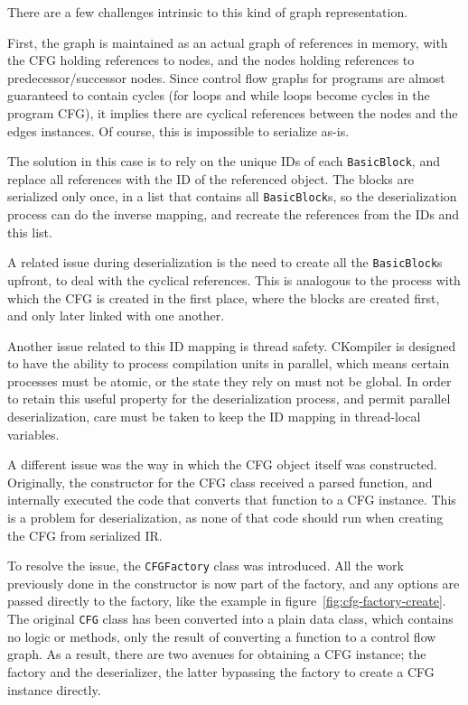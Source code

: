 \documentclass[lettersize,journal]{IEEEtran}
\begin{document}
    There are a few challenges intrinsic to this kind of graph representation.

    First, the graph is maintained as an actual graph of references in memory, with the CFG holding references to nodes,
    and the nodes holding references to predecessor/successor nodes.
    Since control flow graphs for programs are almost guaranteed to contain cycles (for loops and while loops become
    cycles in the program CFG), it implies there are cyclical references between the nodes and the edges instances.
    Of course, this is impossible to serialize as-is.

    The solution in this case is to rely on the unique IDs of each \texttt{BasicBlock}, and replace all references with
    the ID of the referenced object.
    The blocks are serialized only once, in a list that contains all \texttt{BasicBlock}s, so the deserialization
    process can do the inverse mapping, and recreate the references from the IDs and this list.

    A related issue during deserialization is the need to create all the \texttt{BasicBlock}s upfront, to deal
    with the cyclical references.
    This is analogous to the process with which the CFG is created in the first place, where the blocks are created
    first, and only later linked with one another.

    Another issue related to this ID mapping is thread safety.
    CKompiler is designed to have the ability to process compilation units in parallel, which means certain processes
    must be atomic, or the state they rely on must not be global.
    In order to retain this useful property for the deserialization process, and permit parallel deserialization, care
    must be taken to keep the ID mapping in thread-local variables.

    A different issue was the way in which the CFG object itself was constructed.
    Originally, the constructor for the CFG class received a parsed function, and internally executed the code that
    converts that function to a CFG instance.
    This is a problem for deserialization, as none of that code should run when creating the CFG from serialized IR\@.

    To resolve the issue, the \texttt{CFGFactory} class was introduced.
    All the work previously done in the constructor is now part of the factory, and any options are passed directly to
    the factory, like the example in figure~\ref{fig:cfg-factory-create}.
    The original \texttt{CFG} class has been converted into a plain data class, which contains no logic or methods,
    only the result of converting a function to a control flow graph.
    As a result, there are two avenues for obtaining a CFG instance; the factory and the deserializer, the latter
    bypassing the factory to create a CFG instance directly.
\end{document}
